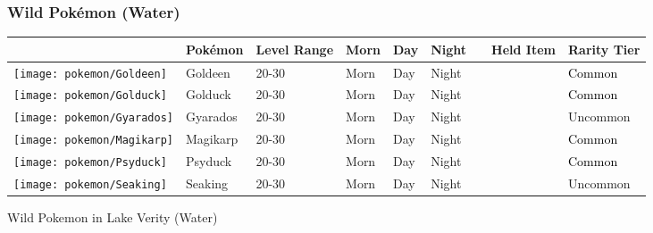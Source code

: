 \subsubsection{Wild Pokémon (Water)}%
\label{ssubsec:WildPokmon(Water)}%
\begin{longtable}{||l l l l l l l l l||}%
\hline%
\rowcolor{WaterColor}%
&Pokémon&Level Range&Morn&Day&Night&&Held Item&Rarity Tier\\%
\hline%
\endhead%
\hline%
\rowcolor{WaterColor}%
\texttt{[image: pokemon/Goldeen]}&Goldeen&20{-}30&Morn&Day&Night&&&\textcolor{black}{%
Common%
}\\%
\hline%
\rowcolor{WaterColor}%
\texttt{[image: pokemon/Golduck]}&Golduck&20{-}30&Morn&Day&Night&&&\textcolor{black}{%
Common%
}\\%
\hline%
\rowcolor{WaterColor}%
\texttt{[image: pokemon/Gyarados]}&Gyarados&20{-}30&Morn&Day&Night&&&\textcolor{OliveGreen}{%
Uncommon%
}\\%
\hline%
\rowcolor{WaterColor}%
\texttt{[image: pokemon/Magikarp]}&Magikarp&20{-}30&Morn&Day&Night&&&\textcolor{black}{%
Common%
}\\%
\hline%
\rowcolor{WaterColor}%
\texttt{[image: pokemon/Psyduck]}&Psyduck&20{-}30&Morn&Day&Night&&&\textcolor{black}{%
Common%
}\\%
\hline%
\rowcolor{WaterColor}%
\texttt{[image: pokemon/Seaking]}&Seaking&20{-}30&Morn&Day&Night&&&\textcolor{OliveGreen}{%
Uncommon%
}\\%
\hline%
\end{longtable}%
\caption{Wild Pokemon in Lake Verity (Water)}